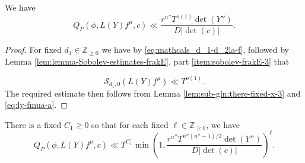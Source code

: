 \begin{lemma}\label{lemma:20230514162116}
  We have
  \begin{equation}\label{eq:q_pphi-f-c}
    Q_P(\phi, L(Y) f^\mu,c) \ll \frac{r^{n''} T^{o(1)}  \det (Y'') }{D |\det (c)| }.
  \end{equation}
\end{lemma}
\begin{proof}
  For fixed $d_1 \in \mathbb{Z}_{\geq 0}$ we have by \eqref{eq:mathcals_d_1-d_2la-f}, followed by Lemma \ref{lem:lemma-Sobolev-estimates-frakE}, part \eqref{item:sobolev-frakE-3} that

  \begin{equation*}
    \mathcal{S}_{d_1,0}(L(Y) f^{\mu})
    \ll
    T^{o(1)}.
  \end{equation*}
  The required estimate then follows from Lemma \ref{lem:sub-gln:there-fixed-x-3} and \eqref{eq:ly-fmua-a}.
\end{proof}

\begin{lemma}\label{lemma:20230514162141}
  There is a fixed $C_1 \geq 0$ so that for each fixed $\ell \in \mathbb{Z}_{\geq 0}$, we have
  \begin{equation}\label{eq:q_pphi-f-c-1}
    Q_P(\phi,L(Y) f^\mu,c) \ll T^{C_1}
    \min \left( 1,
      \frac{r^{n''} T^{n''(n''-1)/2} \det(Y'')}{D |\det (c)|}
    \right)^{\ell }.
  \end{equation}
\end{lemma}

